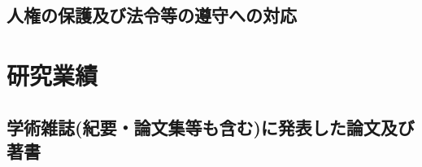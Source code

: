 \documentclass[10pt,a4paper,twoside]{jarticle}
\newcommand{\研究課題名}{XMASS検出器を用いた季節変動による暗黒物質の直接探索}
\newcommand{\研究機関名}{神戸大学}
\newcommand{\申請者氏名}{岡直哉}
\newcommand{\研究代表者氏名}{\申請者氏名}
\newcommand{\研究期間の最終元号年度}{29}	%
\begin{document}
\subsection{人権の保護及び法令等の遵守への対応}
\newcommand{\人権の保護及び法令等の遵守への対応}{%
該当しない。
}

\section{研究業績}
\subsection{学術雑誌(紀要・論文集等も含む)に発表した論文及び著書}
\end{document}

